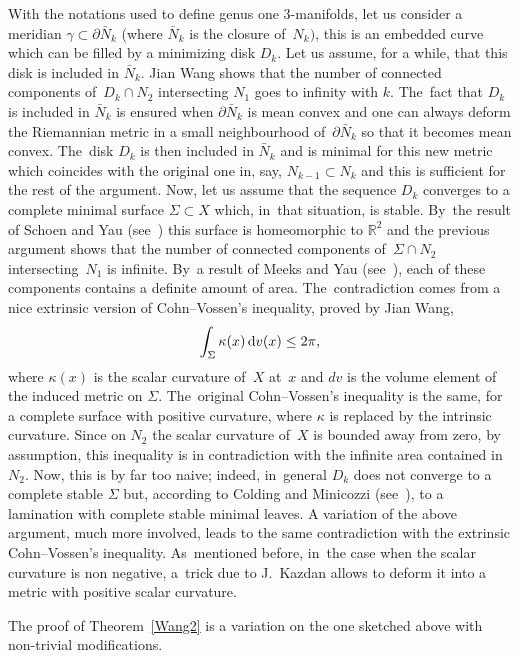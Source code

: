 \documentclass[pdftex]{sigma}
\numberwithin{equation}{section}
\begin{document}
 With the notations used to define genus one $3$-manifolds, let us consider a meridian $\gamma\subset\partial {\bar N}_k$ (where $\bar N_k$ is the
closure of~$N_k)$, this is an embedded curve which can be filled by a minimizing disk $D_k$. Let us assume, for a while, that this disk is included in $\bar N_k$. Jian Wang shows that the number of connected components of~$D_k\cap N_2$ intersecting $N_1$ goes to infinity with $k$. The~fact that $D_k$ is included in $\bar N_k$ is ensured when $\partial \bar N_k$ is mean convex and one can always deform the Riemannian metric in a small neighbourhood of~$\partial \bar N_k$ so that it becomes mean convex. The~disk $D_k$ is then included in $\bar N_k$ and is minimal for this new metric which coincides with the original one in, say, $N_{k-1}\subset N_k$ and this is sufficient for the rest of the argument. Now, let us assume that the sequence $D_k$ converges to a complete minimal surface $\Sigma\subset X$ which, in~that situation, is stable. By~the result of Schoen and Yau (see~\cite{SchoenYau:stable}) this surface is homeomorphic to $\mathbb{R}^2$ and the previous argument shows that the number of connected components of~$\Sigma\cap N_2$ intersecting~$N_1$ is infinite. By~a result of Meeks and Yau (see~\cite{Mee-Yau}), each of these components contains a definite amount of area. The~contradiction comes from a nice extrinsic version of Cohn--Vossen's inequality, proved by Jian Wang,
\[
\int_\Sigma \kappa (x)\,{\rm d} v(x) \leq 2\pi,
\]
where $\kappa (x)$ is the scalar curvature of~$X$ at~$x$ and $dv$ is the volume element of the induced metric on $\Sigma$. The~original Cohn--Vossen's inequality is the same, for a complete surface with positive curvature, where $\kappa$ is replaced by the intrinsic curvature. Since on $N_2$ the scalar curvature of~$X$ is bounded away from zero, by assumption, this inequality is in contradiction with the infinite area contained in~$N_2$. Now, this is by far too naive; indeed, in~general $D_k$ does not converge to a complete stable $\Sigma$ but, according to Colding and Minicozzi
(see~\cite{Col-Min}), to a lamination with complete stable minimal leaves. A variation of the above argument, much more involved, leads to the same contradiction with the extrinsic Cohn--Vossen's inequality. As~mentioned before, in~the case when the scalar curvature is non negative, a~trick
due to J.~Kazdan allows to deform it into a metric with positive scalar curvature.

The proof of Theorem~\ref{Wang2} is a variation on the one sketched above
with non-trivial modifications.
\end{document}
